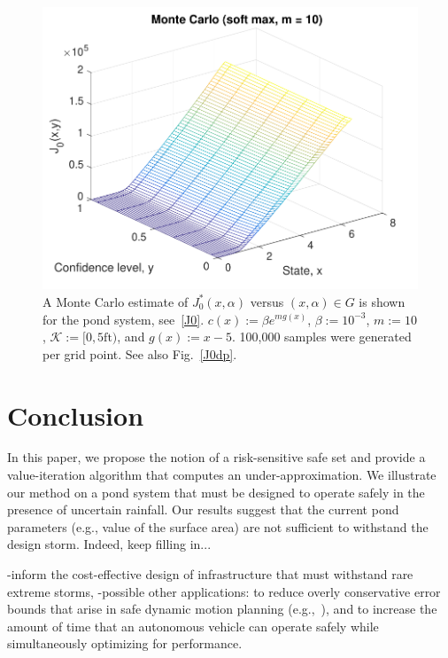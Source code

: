 \documentclass[letterpaper, 10 pt, conference]{ieeeconf}  %
\begin{document}
\begin{figure}[thpb]
      \centering
      \includegraphics[scale=0.5]{monte_carlo_sum_sept112018.pdf}
      \caption{A Monte Carlo estimate of $J_0^*(x,\alpha)$ versus $(x, \alpha) \in G$ is shown for the pond system, see~\eqref{J0}.
	  $c(x) := \beta e^{m g(x)}$, $\beta := 10^{-3}$, $m := 10$, $\mathcal{K} := [0, 5\text{ft})$, and $g(x) := x-5$.
	  100,000 samples were generated per grid point. See also Fig.~\ref{J0dp}.}
      \label{J0mc}
\end{figure}

\section{Conclusion}\label{conc}
In this paper, we propose the notion of a risk-sensitive safe set and provide a value-iteration algorithm 
that computes an under-approximation. We illustrate our method on a pond system that must be designed to operate safely 
in the presence of uncertain rainfall. Our results suggest that the current pond parameters (e.g., value of the surface area) are 
not sufficient to withstand the design storm. Indeed, keep filling in... 

-inform the cost-effective design of infrastructure that must withstand rare extreme storms,
-possible other applications: to reduce overly conservative error bounds that arise in safe dynamic motion planning (e.g.,~\cite{herbert2017fastrack}), 
and to increase the amount of time that an autonomous vehicle can operate safely while simultaneously optimizing for performance.
\end{document}
